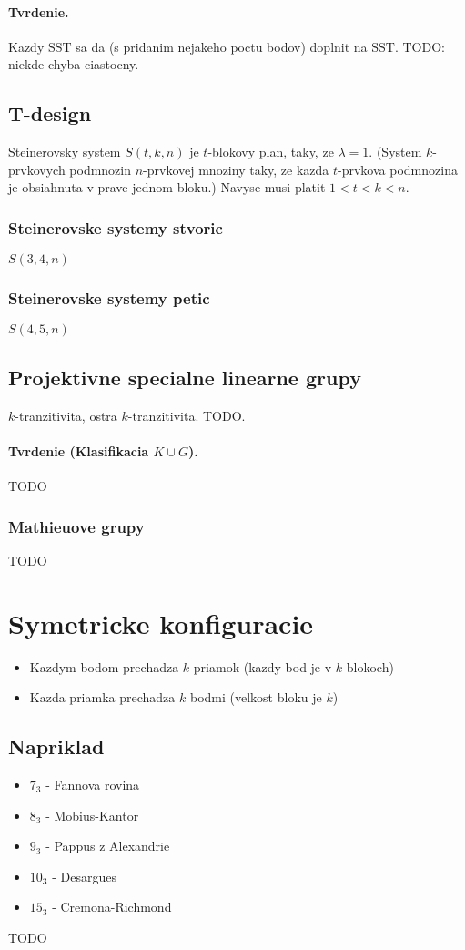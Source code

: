 \documentclass[10pt,a4paper]{article}
\begin{document}
\paragraph{Tvrdenie.} Kazdy SST sa da (s pridanim nejakeho poctu bodov) doplnit na SST. TODO: niekde chyba ciastocny. 

\subsection{T-design}
Steinerovsky system $S(t,k,n)$ je $t$-blokovy plan, taky, ze $\lambda=1$. (System $k$-prvkovych podmnozin $n$-prvkovej mnoziny taky, ze kazda $t$-prvkova podmnozina je obsiahnuta v prave jednom bloku.) Navyse musi platit $1 < t < k < n$.
\subsubsection{Steinerovske systemy stvoric}
$S(3,4,n)$
\subsubsection{Steinerovske systemy petic}
$S(4,5,n)$

\subsection{Projektivne specialne linearne grupy}
$k$-tranzitivita, ostra $k$-tranzitivita. TODO.

\paragraph{Tvrdenie (Klasifikacia $K \cup G$).}
TODO

\subsubsection{Mathieuove grupy}
TODO

\section{Symetricke konfiguracie} 
\begin{itemize}
\item Kazdym bodom prechadza $k$ priamok (kazdy bod je v $k$ blokoch)
\item Kazda priamka prechadza $k$ bodmi (velkost bloku je $k$)
\end{itemize}

\subsection{Napriklad}
\begin{itemize}
\item $7_3$ - Fannova rovina
\item $8_3$ - Mobius-Kantor
\item $9_3$ - Pappus z Alexandrie
\item $10_3$ - Desargues
\item $15_3$ - Cremona-Richmond
\end{itemize}
TODO 
\end{document}
